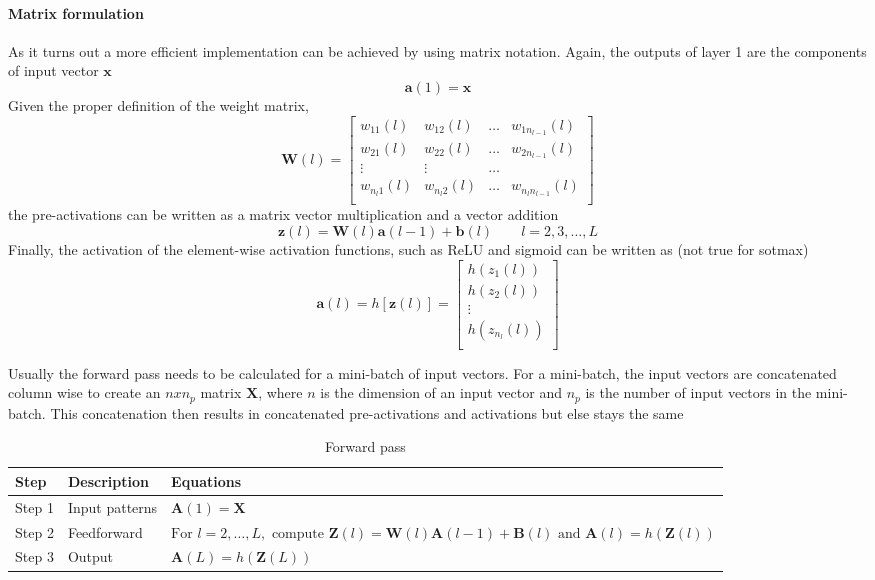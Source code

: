 \paragraph{Matrix formulation}
As it turns out a more efficient implementation can be achieved by using matrix notation.
Again, the outputs of layer 1 are the components of input vector $\mathbf{x}$
\[
  \mathbf{a}(1) = \mathbf{x}
\]
Given the proper definition of the weight matrix,
\[
  \mathbf{W}(l) =
  \begin{bmatrix}
    w_{11}(l) & w_{12}(l) & \ldots & w_{1n_{l-1}}(l) \\
    w_{21}(l) & w_{22}(l) & \ldots & w_{2n_{l-1}}(l) \\
    \vdots & \vdots & \ldots & \\
    w_{n_l1}(l) & w_{n_l2}(l) & \ldots & w_{n_ln_{l-1}}(l) \\
  \end{bmatrix}
\]
the pre-activations can be written as a matrix vector multiplication and a vector addition
\[
  \mathbf{z}(l) = \mathbf{W}(l)\mathbf{a}(l-1) + \mathbf{b}(l) \qquad l=2,3,\ldots,L
\]
Finally, the activation of the element-wise activation functions, such as ReLU and sigmoid can be written as (not true for sotmax)
\[
  \mathbf{a}(l) = h[\mathbf{z}(l)] =
  \begin{bmatrix}
    h(z_1(l)) \\
    h(z_2(l)) \\
    \vdots \\
    h(z_{n_l}(l)) \\
  \end{bmatrix}
\]


Usually the forward pass needs to be calculated for a mini-batch of input vectors.
For a mini-batch, the input vectors are concatenated column wise to create an $nxn_p$ matrix $\mathbf{X}$, where $n$ is the dimension of an input vector and $n_p$ is the number of input vectors in the mini-batch.
This concatenation then results in concatenated pre-activations and activations but else stays the same

\begin{table}[h]
	\begin{tabularx}{\textwidth}{lXl}
		\textbf{Step} & \textbf{Description} & \textbf{Equations} \\ \hline
		Step 1 & Input patterns & $\displaystyle\mathbf{A}(1) = \mathbf{X}$ \\
		Step 2 & Feedforward & $\displaystyle\text{For } l=2,\ldots,L, \text{ compute } \mathbf{Z}(l) = \mathbf{W}(l)\mathbf{A}(l-1) + \mathbf{B}(l) \text{ and } \mathbf{A}(l) = h(\mathbf{Z}(l))$ \\
		Step 3 & Output & $\displaystyle\mathbf{A}(L) = h(\mathbf{Z}(L))$ \\
		\hline
	\end{tabularx}
  \caption{Forward pass}
  \label{tab:forwardPass}
\end{table}

